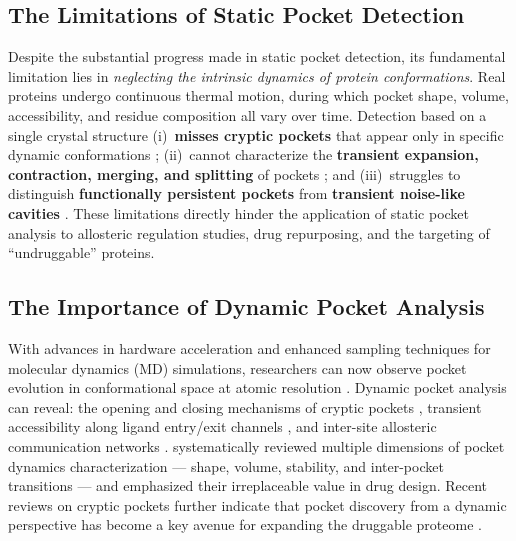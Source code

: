 \documentclass[11pt,a4paper]{article}
\begin{document}
\subsection{The Limitations of Static Pocket Detection}
Despite the substantial progress made in static pocket detection, its
fundamental limitation lies in \emph{neglecting the intrinsic
dynamics of protein conformations}. Real proteins undergo continuous
thermal motion, during which pocket shape, volume, accessibility, and
residue composition all vary over time. Detection based on a single
crystal structure (i)~\textbf{misses cryptic pockets} that appear
only in specific dynamic conformations \citep{meller2025cryptic};
(ii)~cannot characterize the \textbf{transient expansion,
contraction, merging, and splitting} of pockets
\citep{stank2016protein,lindow2013exploring}; and (iii)~struggles to
distinguish \textbf{functionally persistent pockets} from
\textbf{transient noise-like cavities} \citep{parulek2013visual}.
These limitations directly hinder the application of static pocket
analysis to allosteric regulation studies, drug repurposing, and the
targeting of ``undruggable'' proteins.

\subsection{The Importance of Dynamic Pocket Analysis}
With advances in hardware acceleration and enhanced sampling
techniques for molecular dynamics (MD) simulations, researchers can
now observe pocket evolution in conformational space at atomic
resolution \citep{stank2016protein,vant2024complex}. Dynamic pocket
analysis can reveal: the opening and closing mechanisms of cryptic
pockets \citep{meller2025cryptic}, transient accessibility along
ligand entry/exit channels \citep{lindow2013exploring}, and inter-site
allosteric communication networks
\citep{centrality2021highlight,sheikamamuddy2021allosteric,
lasala2017pocket}. \citet{stank2016protein} systematically reviewed
multiple dimensions of pocket dynamics characterization --- shape,
volume, stability, and inter-pocket transitions --- and emphasized
their irreplaceable value in drug design. Recent reviews on cryptic
pockets further indicate that pocket discovery from a dynamic
perspective has become a key avenue for expanding the druggable
proteome \citep{meller2025cryptic}.
\end{document}
